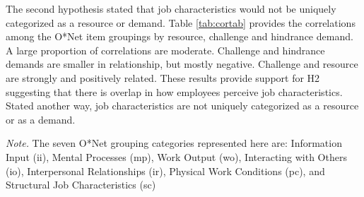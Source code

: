 \documentclass[
  english,
  man]{apa6}
\newenvironment{lltable}{\begin{landscape}\begin{center}\begin{ThreePartTable}}{\end{ThreePartTable}\end{center}\end{landscape}}
\begin{document}
The second hypothesis stated that job characteristics would not be uniquely categorized as a resource or demand. Table \ref{tab:cortab} provides the correlations among the O*Net item groupings by resource, challenge and hindrance demand. A large proportion of correlations are moderate. Challenge and hindrance demands are smaller in relationship, but mostly negative. Challenge and resource are strongly and positively related. These results provide support for H2 suggesting that there is overlap in how employees perceive job characteristics. Stated another way, job characteristics are not uniquely categorized as a resource or as a demand.

\begin{lltable}

\begin{TableNotes}[para]
\normalsize{\textit{Note.} The seven O*Net grouping categories represented here are: Information Input (ii), Mental Processes (mp), Work Output (wo), Interacting with Others (io), Interpersonal Relationships (ir), Physical Work Conditions (pc), and Structural Job Characteristics (sc)}
\end{TableNotes}

\small{

}
\end{lltable}
\end{document}

